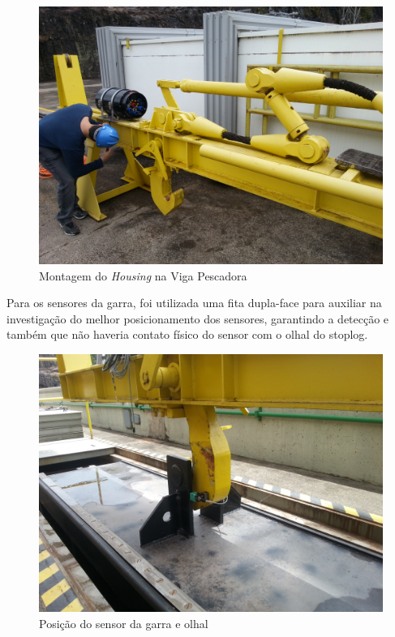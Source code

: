 \begin{figure}[h]
\centering
	\includegraphics[width=0.9\columnwidth]{figs/housing_montagem}
	\caption{Montagem do \textit{Housing} na Viga Pescadora}
	\label{fig::housing_montagem}
\end{figure}
 
 Para os sensores da garra, foi utilizada uma fita dupla-face
 para auxiliar na investigação do melhor posicionamento dos sensores, garantindo
 a detecção e também que não haveria contato físico do sensor com o olhal do
 stoplog.
 
\begin{figure}[h!]
\centering
	\includegraphics[width=0.9\columnwidth]{figs/sensor_olhal}
	\caption{Posição do sensor da garra e olhal}
	\label{fig::sensor_olhal}
\end{figure}

